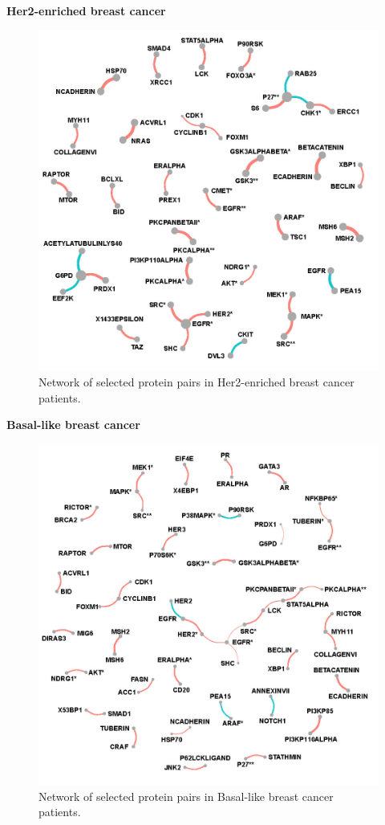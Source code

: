 \documentclass[
]{book}
\begin{document}
\textbf{Her2-enriched breast cancer}

\begin{figure}

{\centering \includegraphics[width=0.7\linewidth]{images/subtype_fullnet_her2} 

}

\caption{Network of selected protein pairs in Her2-enriched breast cancer patients.}\label{fig:herfullnet}
\end{figure}

\textbf{Basal-like breast cancer}

\begin{figure}

{\centering \includegraphics[width=0.7\linewidth]{images/subtype_fullnet_basal} 

}

\caption{Network of selected protein pairs in Basal-like breast cancer patients.}\label{fig:basalfullnet}
\end{figure}
\end{document}
